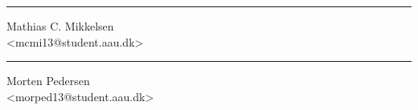 \vspace{3\baselineskip}
\noindent
\begin{minipage}[b]{0.45\textwidth}
 \centering
 \rule{\textwidth}{0.5pt}
  Mathias C. Mikkelsen\\
 {\footnotesize <mcmi13@student.aau.dk>}
\end{minipage}
\hfill
\begin{minipage}[b]{0.45\textwidth}
 \centering
 \rule{\textwidth}{0.5pt}
  Morten Pedersen\\
 {\footnotesize <morped13@student.aau.dk>}
\end{minipage}